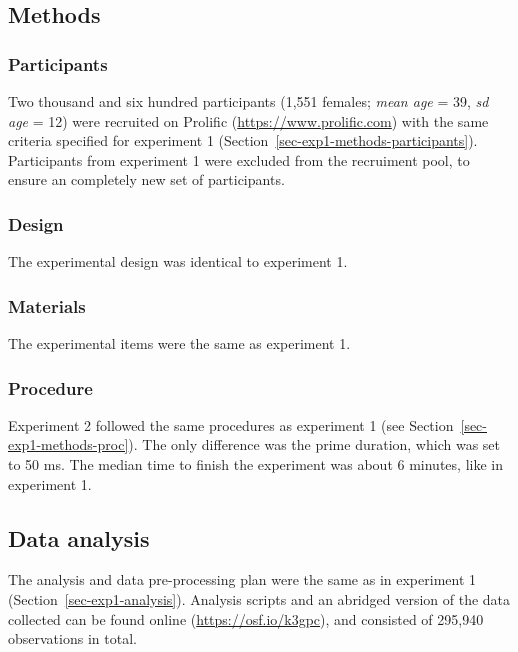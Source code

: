 \documentclass[
]{interact}
\begin{document}
\subsection{Methods}\label{sec-exp2-methods}

\subsubsection{Participants}\label{sec-exp2-methods-participants}

Two thousand and six hundred participants (1,551 females; \emph{mean
age} = 39, \emph{sd age} = 12) were recruited on Prolific
(\url{https://www.prolific.com}) with the same criteria specified for
experiment 1 (Section~\ref{sec-exp1-methods-participants}). Participants
from experiment 1 were excluded from the recruiment pool, to ensure an
completely new set of participants.

\subsubsection{Design}\label{sec-exp2-methods-design}

The experimental design was identical to experiment 1.

\subsubsection{Materials}\label{sec-exp2-methods-materials}

The experimental items were the same as experiment 1.

\subsubsection{Procedure}\label{sec-exp2-methods-proc}

Experiment 2 followed the same procedures as experiment 1 (see
Section~\ref{sec-exp1-methods-proc}). The only difference was the prime
duration, which was set to 50 ms. The median time to finish the
experiment was about 6 minutes, like in experiment 1.

\subsection{Data analysis}\label{sec-exp2-analysis}

The analysis and data pre-processing plan were the same as in experiment
1 (Section~\ref{sec-exp1-analysis}). Analysis scripts and an abridged
version of the data collected can be found online
(\url{https://osf.io/k3gpc}), and consisted of 295,940 observations in
total.
\end{document}
